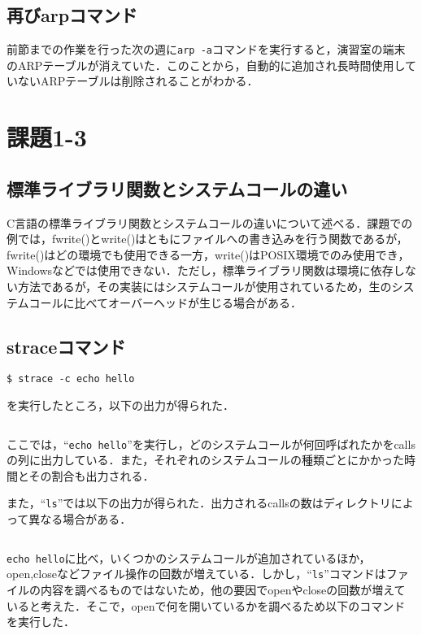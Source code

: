 \documentclass[a4j,10pt,titlepage]{jsarticle}
\begin{document}
\subsection{再びarpコマンド}
前節までの作業を行った次の週に\verb|arp -a|コマンドを実行すると，演習室の端末のARPテーブルが消えていた．このことから，自動的に追加され長時間使用していないARPテーブルは削除されることがわかる．

\section{課題1-3}
\subsection{標準ライブラリ関数とシステムコールの違い}
C言語の標準ライブラリ関数とシステムコールの違いについて述べる．課題での例では，fwrite()とwrite()はともにファイルへの書き込みを行う関数であるが，fwrite()はどの環境でも使用できる一方，write()はPOSIX環境でのみ使用でき，Windowsなどでは使用できない．ただし，標準ライブラリ関数は環境に依存しない方法であるが，その実装にはシステムコールが使用されているため，生のシステムコールに比べてオーバーヘッドが生じる場合がある．

\subsection{straceコマンド}
\begin{verbatim}
$ strace -c echo hello
\end{verbatim}
を実行したところ，以下の出力が得られた．

\begin{verbatim}

\end{verbatim}

ここでは，``\verb|echo hello|''を実行し，どのシステムコールが何回呼ばれたかをcallsの列に出力している．また，それぞれのシステムコールの種類ごとにかかった時間とその割合も出力される．

また，``\verb|ls|''では以下の出力が得られた．出力されるcallsの数はディレクトリによって異なる場合がある．
\begin{verbatim}

\end{verbatim}

\verb|echo hello|に比べ，いくつかのシステムコールが追加されているほか，open,closeなどファイル操作の回数が増えている．しかし，``\verb|ls|''コマンドはファイルの内容を調べるものではないため，他の要因でopenやcloseの回数が増えていると考えた．そこで，openで何を開いているかを調べるため以下のコマンドを実行した．
\end{document}

